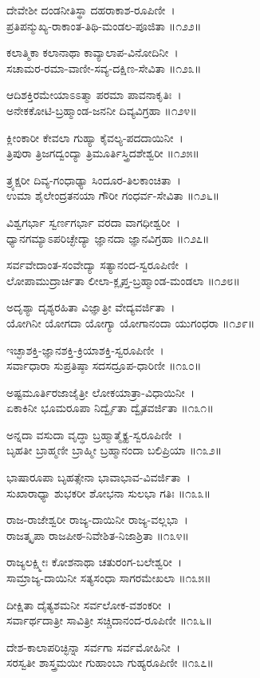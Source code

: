 ದೇವೇಶೀ ದಂಡನೀತಿಸ್ಥಾ ದಹರಾಕಾಶ-ರೂಪಿಣೀ~।\\
ಪ್ರತಿಪನ್ಮುಖ್ಯ-ರಾಕಾಂತ-ತಿಥಿ-ಮಂಡಲ-ಪೂಜಿತಾ ॥೧೨೨॥

ಕಲಾತ್ಮಿಕಾ ಕಲಾನಾಥಾ ಕಾವ್ಯಾಲಾಪ-ವಿನೋದಿನೀ~।\\
ಸಚಾಮರ-ರಮಾ-ವಾಣೀ-ಸವ್ಯ-ದಕ್ಷಿಣ-ಸೇವಿತಾ ॥೧೨೩॥

ಆದಿಶಕ್ತಿರಮೇಯಾಽಽತ್ಮಾ ಪರಮಾ ಪಾವನಾಕೃತಿಃ~।\\
ಅನೇಕಕೋಟಿ-ಬ್ರಹ್ಮಾಂಡ-ಜನನೀ ದಿವ್ಯವಿಗ್ರಹಾ ॥೧೨೪॥

ಕ್ಲೀಂಕಾರೀ ಕೇವಲಾ ಗುಹ್ಯಾ ಕೈವಲ್ಯ-ಪದದಾಯಿನೀ~।\\
ತ್ರಿಪುರಾ ತ್ರಿಜಗದ್ವಂದ್ಯಾ ತ್ರಿಮೂರ್ತಿಸ್ತ್ರಿದಶೇಶ್ವರೀ ॥೧೨೫॥

ತ್ರ್ಯಕ್ಷರೀ ದಿವ್ಯ-ಗಂಧಾಢ್ಯಾ ಸಿಂದೂರ-ತಿಲಕಾಂಚಿತಾ~।\\
ಉಮಾ ಶೈಲೇಂದ್ರತನಯಾ ಗೌರೀ ಗಂಧರ್ವ-ಸೇವಿತಾ ॥೧೨೬॥

ವಿಶ್ವಗರ್ಭಾ ಸ್ವರ್ಣಗರ್ಭಾ ವರದಾ ವಾಗಧೀಶ್ವರೀ~।\\
ಧ್ಯಾನಗಮ್ಯಾಽಪರಿಚ್ಛೇದ್ಯಾ ಜ್ಞಾನದಾ ಜ್ಞಾನವಿಗ್ರಹಾ ॥೧೨೭॥

ಸರ್ವವೇದಾಂತ-ಸಂವೇದ್ಯಾ ಸತ್ಯಾನಂದ-ಸ್ವರೂಪಿಣೀ~।\\
ಲೋಪಾಮುದ್ರಾರ್ಚಿತಾ ಲೀಲಾ-ಕ್ಲೃಪ್ತ-ಬ್ರಹ್ಮಾಂಡ-ಮಂಡಲಾ ॥೧೨೮॥

ಅದೃಶ್ಯಾ ದೃಶ್ಯರಹಿತಾ ವಿಜ್ಞಾತ್ರೀ ವೇದ್ಯವರ್ಜಿತಾ~।\\
ಯೋಗಿನೀ ಯೋಗದಾ ಯೋಗ್ಯಾ ಯೋಗಾನಂದಾ ಯುಗಂಧರಾ ॥೧೨೯॥

ಇಚ್ಛಾಶಕ್ತಿ-ಜ್ಞಾನಶಕ್ತಿ-ಕ್ರಿಯಾಶಕ್ತಿ-ಸ್ವರೂಪಿಣೀ~।\\
ಸರ್ವಾಧಾರಾ ಸುಪ್ರತಿಷ್ಠಾ ಸದಸದ್ರೂಪ-ಧಾರಿಣೀ ॥೧೩೦॥

ಅಷ್ಟಮೂರ್ತಿರಜಾಜೈತ್ರೀ ಲೋಕಯಾತ್ರಾ-ವಿಧಾಯಿನೀ~।\\
ಏಕಾಕಿನೀ ಭೂಮರೂಪಾ ನಿರ್ದ್ವೈತಾ ದ್ವೈತವರ್ಜಿತಾ ॥೧೩೧॥

ಅನ್ನದಾ ವಸುದಾ ವೃದ್ಧಾ ಬ್ರಹ್ಮಾತ್ಮೈಕ್ಯ-ಸ್ವರೂಪಿಣೀ~।\\
ಬೃಹತೀ ಬ್ರಾಹ್ಮಣೀ ಬ್ರಾಹ್ಮೀ ಬ್ರಹ್ಮಾನಂದಾ ಬಲಿಪ್ರಿಯಾ ॥೧೩೨॥

ಭಾಷಾರೂಪಾ ಬೃಹತ್ಸೇನಾ ಭಾವಾಭಾವ-ವಿವರ್ಜಿತಾ~।\\
ಸುಖಾರಾಧ್ಯಾ ಶುಭಕರೀ ಶೋಭನಾ ಸುಲಭಾ ಗತಿಃ ॥೧೩೩॥

ರಾಜ-ರಾಜೇಶ್ವರೀ ರಾಜ್ಯ-ದಾಯಿನೀ ರಾಜ್ಯ-ವಲ್ಲಭಾ~।\\
ರಾಜತ್ಕೃಪಾ ರಾಜಪೀಠ-ನಿವೇಶಿತ-ನಿಜಾಶ್ರಿತಾ ॥೧೩೪॥

ರಾಜ್ಯಲಕ್ಷ್ಮೀಃ ಕೋಶನಾಥಾ ಚತುರಂಗ-ಬಲೇಶ್ವರೀ~।\\
ಸಾಮ್ರಾಜ್ಯ-ದಾಯಿನೀ ಸತ್ಯಸಂಧಾ ಸಾಗರಮೇಖಲಾ ॥೧೩೫॥

ದೀಕ್ಷಿತಾ ದೈತ್ಯಶಮನೀ ಸರ್ವಲೋಕ-ವಶಂಕರೀ~।\\
ಸರ್ವಾರ್ಥದಾತ್ರೀ ಸಾವಿತ್ರೀ ಸಚ್ಚಿದಾನಂದ-ರೂಪಿಣೀ  ॥೧೩೬॥

ದೇಶ-ಕಾಲಾಪರಿಚ್ಛಿನ್ನಾ ಸರ್ವಗಾ ಸರ್ವಮೋಹಿನೀ~।\\
ಸರಸ್ವತೀ ಶಾಸ್ತ್ರಮಯೀ ಗುಹಾಂಬಾ ಗುಹ್ಯರೂಪಿಣೀ ॥೧೩೭॥

